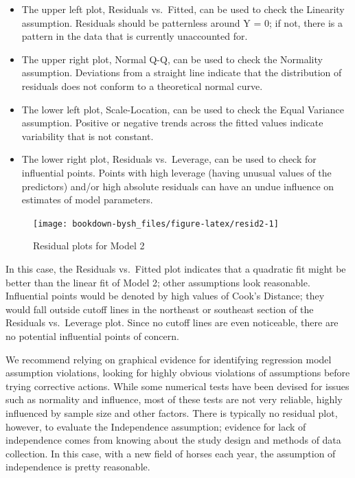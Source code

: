 \documentclass[
]{krantz}
\providecommand{\tightlist}{%
  \setlength{\itemsep}{0pt}\setlength{\parskip}{0pt}}
\begin{document}
\begin{itemize}
\tightlist
\item
  The upper left plot, Residuals vs.~Fitted, can be used to check the Linearity assumption. Residuals should be patternless around Y = 0; if not, there is a pattern in the data that is currently unaccounted for.
\item
  The upper right plot, Normal Q-Q, can be used to check the Normality assumption. Deviations from a straight line indicate that the distribution of residuals does not conform to a theoretical normal curve.
\item
  The lower left plot, Scale-Location, can be used to check the Equal Variance assumption. Positive or negative trends across the fitted values indicate variability that is not constant.
\item
  The lower right plot, Residuals vs.~Leverage, can be used to check for influential points. Points with high leverage (having unusual values of the predictors) and/or high absolute residuals can have an undue influence on estimates of model parameters.
\end{itemize}

\begin{figure}

{\centering \texttt{[image: bookdown-bysh\_files/figure-latex/resid2-1]} 

}

\caption{Residual plots for Model 2}\label{fig:resid2}
\end{figure}

In this case, the Residuals vs.~Fitted plot indicates that a quadratic fit might be better than the linear fit of Model 2; other assumptions look reasonable. Influential points would be denoted by high values of Cook's Distance; they would fall outside cutoff lines in the northeast or southeast section of the Residuals vs.~Leverage plot. Since no cutoff lines are even noticeable, there are no potential influential points of concern.

We recommend relying on graphical evidence for identifying regression model assumption violations, looking for highly obvious violations of assumptions before trying corrective actions. While some numerical tests have been devised for issues such as normality and influence, most of these tests are not very reliable, highly influenced by sample size and other factors. There is typically no residual plot, however, to evaluate the Independence assumption; evidence for lack of independence comes from knowing about the study design and methods of data collection. In this case, with a new field of horses each year, the assumption of independence is pretty reasonable.
\end{document}
